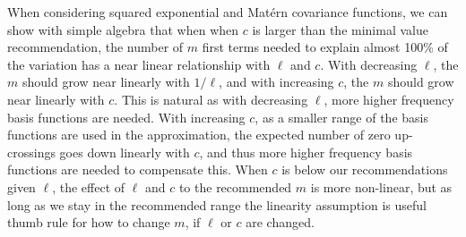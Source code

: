When considering squared exponential and Mat{\'e}rn covariance functions, we can show with simple algebra that when when $c$ is larger than the minimal value recommendation, the number of $m$ first terms needed to explain almost 100\% of the variation has a near linear relationship with $\ell$ and $c$. With decreasing $\ell$, the $m$ should grow near linearly with $1/\ell$, and with increasing $c$, the $m$ should grow near linearly with $c$.
%
This is natural as with decreasing $\ell$, more higher frequency basis functions are needed. With increasing $c$, as a smaller range of the basis functions are used in the approximation, the expected number of zero up-crossings goes down linearly with $c$, and thus more higher frequency basis functions are needed to compensate this.
%
When $c$ is below our recommendations given $\ell$, the effect of $\ell$ and $c$ to the recommended $m$ is more non-linear, but as long as we stay in the recommended range the linearity assumption is useful thumb rule for how to change $m$, if $\ell$ or $c$ are changed.



